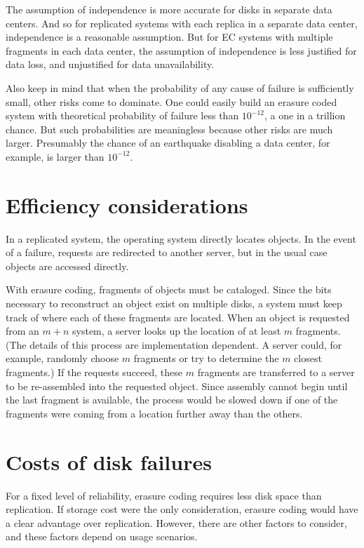 \documentclass[11pt]{article}
\begin{document}
The assumption of independence is more accurate for disks in separate data centers. And so for replicated systems with each replica in a separate data center, independence is a reasonable assumption. But for EC systems with multiple fragments in each data center, the assumption of independence is less justified for data loss, and unjustified for data unavailability.

Also keep in mind that when the probability of any cause of failure is sufficiently small, other risks come to dominate. One could easily build an erasure coded system with theoretical probability of failure less than $10^{-12}$, a one in a trillion chance. But such probabilities are meaningless because other risks are much larger. Presumably the chance of an earthquake disabling a data center, for example, is larger than $10^{-12}$.

\section{Efficiency considerations}

In a replicated system, the operating system directly locates objects. In the event of a failure, requests are redirected to another server, but in the usual case objects are accessed directly. 

With erasure coding, fragments of objects must be cataloged. Since the bits necessary to reconstruct an object exist on multiple disks, a system must keep track of where each of these fragments are located. When an object is requested from an $m+n$ system, a server looks up the location of at least $m$ fragments. (The details of this process are implementation dependent. A server could, for example, randomly choose $m$ fragments or try to determine the $m$ closest fragments.) If the requests succeed, these $m$ fragments are transferred to a server to be re-assembled into the requested object. Since assembly cannot begin until the last fragment is available, the process would be slowed down if one of the fragments were coming from a location further away than the others.

\section{Costs of disk failures}

For a fixed level of reliability, erasure coding requires less disk space than replication. If storage cost were the only consideration, erasure coding would have a clear advantage over replication. However, there are other factors to consider, and these factors depend on usage scenarios.
\end{document}
